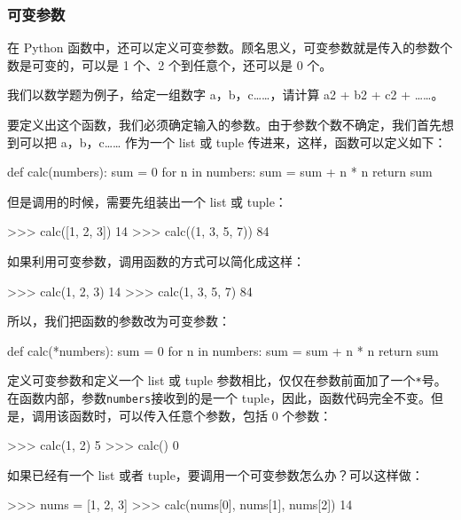 \hypertarget{ux53efux53d8ux53c2ux6570}{%
\subsubsection{可变参数}\label{ux53efux53d8ux53c2ux6570}}

在 Python
函数中，还可以定义可变参数。顾名思义，可变参数就是传入的参数个数是可变的，可以是
1 个、2 个到任意个，还可以是 0 个。

我们以数学题为例子，给定一组数字 a，b，c\ldots\ldots，请计算 a2 + b2 +
c2 + \ldots\ldots。

要定义出这个函数，我们必须确定输入的参数。由于参数个数不确定，我们首先想到可以把
a，b，c\ldots\ldots{} 作为一个 list 或 tuple
传进来，这样，函数可以定义如下：

\begin{pythoncode}
def calc(numbers):
    sum = 0
    for n in numbers:
        sum = sum + n * n
    return sum
\end{pythoncode}

但是调用的时候，需要先组装出一个 list 或 tuple：

\begin{pythoncode}
>>> calc([1, 2, 3])
14
>>> calc((1, 3, 5, 7))
84
\end{pythoncode}

如果利用可变参数，调用函数的方式可以简化成这样：

\begin{pythoncode}
>>> calc(1, 2, 3)
14
>>> calc(1, 3, 5, 7)
84
\end{pythoncode}

所以，我们把函数的参数改为可变参数：

\begin{pythoncode}
def calc(*numbers):
    sum = 0
    for n in numbers:
        sum = sum + n * n
    return sum
\end{pythoncode}

定义可变参数和定义一个 list 或 tuple
参数相比，仅仅在参数前面加了一个\texttt{*}号。在函数内部，参数\texttt{numbers}接收到的是一个
tuple，因此，函数代码完全不变。但是，调用该函数时，可以传入任意个参数，包括
0 个参数：

\begin{pythoncode}
>>> calc(1, 2)
5
>>> calc()
0
\end{pythoncode}

如果已经有一个 list 或者 tuple，要调用一个可变参数怎么办？可以这样做：

\begin{pythoncode}
>>> nums = [1, 2, 3]
>>> calc(nums[0], nums[1], nums[2])
14
\end{pythoncode}

